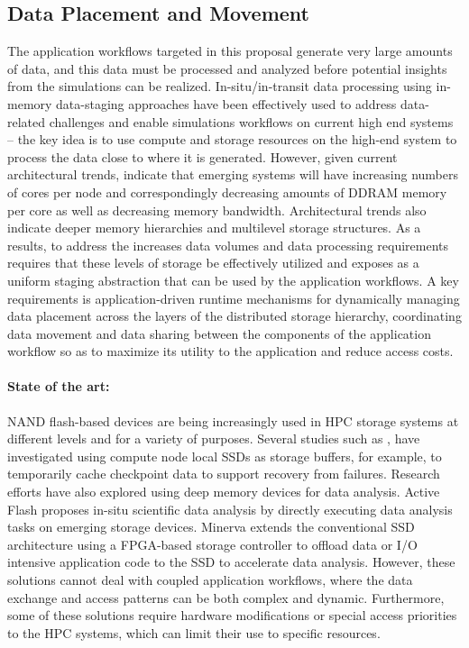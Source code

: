 \subsection{Data Placement and Movement}

The application workflows targeted in this proposal generate very large
amounts of data, and this data must be processed and analyzed before
potential insights from the simulations can be realized. In-situ/in-transit
data processing using in-memory data-staging approaches have been
effectively used to address data-related challenges and enable simulations
workflows on current high end systems -- the key idea is to use compute and
storage resources on the high-end system to process the data close to where
it is generated. However, given current architectural trends, indicate that
emerging systems will have increasing numbers of cores per node and
correspondingly decreasing amounts of DDRAM memory per core as well as
decreasing memory bandwidth. Architectural trends also indicate deeper
memory hierarchies and multilevel storage structures. As a results, to
address the increases data volumes and data processing requirements requires
that these levels of storage be effectively utilized and exposes as a
uniform staging abstraction that can be used by the application workflows. A
key requirements is application-driven runtime mechanisms for dynamically
managing data placement across the layers of the distributed storage
hierarchy, coordinating data movement and data sharing between the
components of the application workflow so as to maximize its utility to the
application and reduce access costs.

\paragraph{State of the art:} NAND flash-based devices are being
increasingly used in HPC storage systems at different levels and for a
variety of purposes. Several studies such as \cite{multitier}, \cite{sc10li}
have investigated using compute node local SSDs as storage buffers, for
example, to temporarily cache checkpoint data to support recovery from
failures. Research efforts have also explored using deep memory devices for
data analysis. Active Flash \cite{activeflash} proposes in-situ scientific
data analysis by directly executing data analysis tasks on emerging storage
devices. Minerva \cite{minerva} extends the conventional SSD architecture
using a FPGA-based storage controller to offload data or I/O intensive
application code to the SSD to accelerate data analysis. However, these
solutions cannot deal with coupled application workflows, where the data
exchange and access patterns can be both complex and dynamic. Furthermore,
some of these solutions require hardware modifications or special access
priorities to the HPC systems, which can limit their use to specific
resources.

